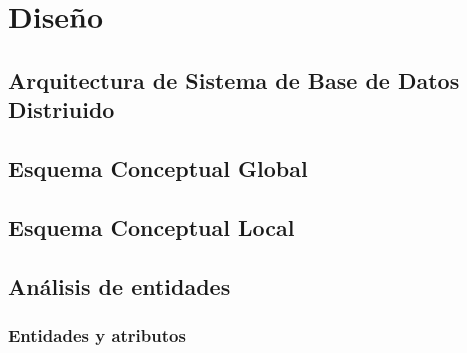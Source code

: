 \documentclass[spanish, 12pt]{article}
\begin{document}
	\section{Diseño}
	\label{diseuxf1o}

	\subsection{Arquitectura de Sistema de Base de Datos Distriuido}
	\label{arquitectura-de-sistema-de-base-de-datos-distriuido}

	\subsection{Esquema Conceptual Global}
	\label{esquema-conceptual-global}

	\subsection{Esquema Conceptual Local}
	\label{esquema-conceptual-local}

	\subsection{Análisis de entidades}
	\label{anuxe1lisis-de-entidades}

	\subsubsection{Entidades y atributos}
	\label{entidades-y-atributos}
\end{document}
